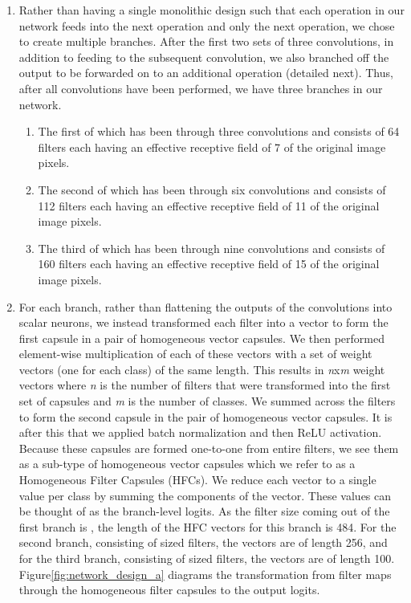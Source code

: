 \documentclass{article}
\newcommand{\rightparenthesis}{)}
\begin{document}
\begin{enumerate}[label=\arabic*\rightparenthesis]
\item Rather than having a single monolithic design such that each operation in our network feeds into the next operation and only the next operation, we chose to create multiple branches.  After the first two sets of three convolutions, in addition to feeding to the subsequent convolution, we also branched off the output to be forwarded on to an additional operation (detailed next).  Thus, after all convolutions have been performed, we have three branches in our network.
\begin{enumerate}[label=\alph*\rightparenthesis]
\item The first of which has been through three  convolutions and consists of 64 filters each having an effective receptive field of 7 of the original image pixels.
\item The second of which has been through six  convolutions and consists of 112 filters each having an effective receptive field of 11 of the original image pixels.
\item The third of which has been through nine  convolutions and consists of 160 filters each having an effective receptive field of 15 of the original image pixels.
\end{enumerate}
\item For each branch, rather than flattening the outputs of the convolutions into scalar neurons, we instead transformed each filter into a vector to form the first capsule in a pair of homogeneous vector capsules.  We then performed element-wise multiplication of each of these vectors with a set of weight vectors (one for each class) of the same length.  This results in \textit{n}x\textit{m} weight vectors where \textit{n} is the number of filters that were transformed into the first set of capsules and \textit{m} is the number of classes.  We summed across the filters to form the second capsule in the pair of homogeneous vector capsules.  It is after this that we applied batch normalization and then ReLU activation.  Because these capsules are formed one-to-one from entire filters, we see them as a sub-type of homogeneous vector capsules which we refer to as a Homogeneous Filter Capsules (HFCs).  We reduce each vector to a single value per class by summing the components of the vector.  These values can be thought of as the branch-level logits.
As the filter size coming out of the first branch is , the length of the HFC vectors for this branch is 484. For the second branch, consisting of  sized filters, the vectors are of length 256, and for the third branch, consisting of  sized filters, the vectors are of length 100.  Figure\autoref{fig:network_design_a} diagrams the transformation from filter maps through the homogeneous filter capsules to the output logits.
\end{enumerate}
\end{document}
